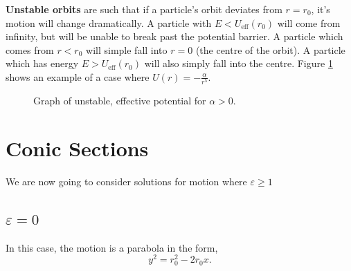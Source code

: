 \documentclass{book}
\begin{document}
\noindent
\textbf{Unstable orbits} are such that if a particle's orbit deviates from $r = r_0$, it's motion will change dramatically. A particle with $E < U_{\text{eff}}(r_0)$ will come from infinity, but will be unable to break past the potential barrier. A particle which comes from $r < r_0$ will simple fall into $r = 0$ (the centre of the orbit). A particle which has energy $E > U_{\text{eff}}(r_0)$ will also simply fall into the centre. Figure \ref{fig:unstable} shows an example of a case where $U(r) = -\frac{\alpha}{r^5}$.
\begin{figure}
    \centering
    \caption{Graph of unstable, effective potential for $\alpha > 0$.}
    \label{fig:unstable}
\end{figure}
\section{Conic Sections}
We are now going to consider solutions for motion where $\varepsilon \geq 1$
\subsection{$\varepsilon = 0$}
In this case, the motion is a parabola in the form,
\begin{equation}
    y^2 = r_0^2 - 2r_0x.
\end{equation}
\end{document}
